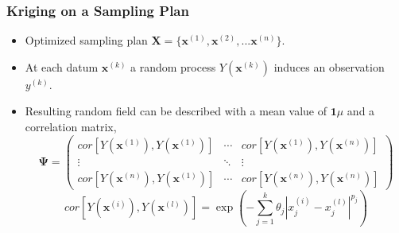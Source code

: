 \documentclass{beamer}
\begin{document}
\begin{frame}
\frametitle{Kriging on a Sampling Plan}

\begin{itemize}
  \item Optimized sampling plan $\textbf{X}=\lbrace \textbf{x}^{(1)}, \textbf{x}^{(2)}, ... \textbf{x}^{(n)}\rbrace$. 
  \item At each datum $\textbf{x}^{(k)}$ a random process $Y(\textbf{x}^{(k)})$ induces an observation $y^{(k)}$.
  \item Resulting random field can be described with a mean value of $\textbf{1}\mu$ and a correlation matrix,
\begin{equation}
 \boldsymbol{\Psi} =
 \begin{pmatrix} 
	cor[Y(\textbf{x}^{(1)}), Y(\textbf{x}^{(1)})] & \cdots & 
		cor[Y(\textbf{x}^{(1)}), Y(\textbf{x}^{(n)})] \\
	\vdots & \ddots & \vdots \\ 
	cor[Y(\textbf{x}^{(n)}), Y(\textbf{x}^{(1)})] & \cdots & 
		cor[Y(\textbf{x}^{(n)}), Y(\textbf{x}^{(n)})]
 \end{pmatrix} \nonumber
\end{equation}  
\begin{equation}
   cor[Y(\textbf{x}^{(i)}), Y(\textbf{x}^{(l)})] = 
    \exp\left(-\sum_{j=1}^k \theta_j |x_j^{(i)} - x_j^{(l)} |^{p_j} \right) \nonumber
\end{equation}
\end{itemize}

\end{frame}
\end{document}

